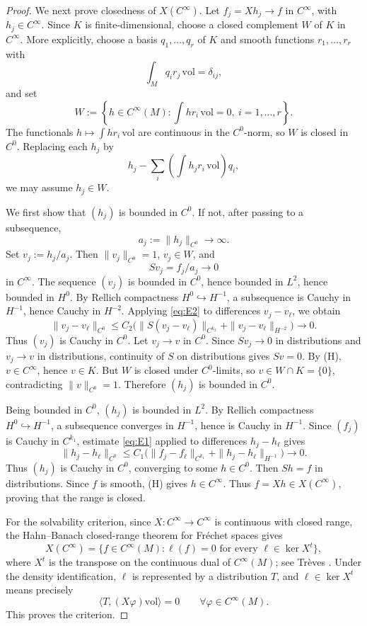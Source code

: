 \documentclass[12pt]{article}
\theoremstyle{definition}
\newcommand{\vol}{\mathrm{vol}}
\begin{document}
\begin{proof}
We next prove closedness of \(X(C^\infty)\).  Let \(f_j=Xh_j\to f\) in \(C^\infty\), with \(h_j\in C^\infty\).  Since \(K\) is finite-dimensional, choose a closed complement \(W\) of \(K\) in \(C^\infty\).  More explicitly, choose a basis \(q_1,\dots,q_r\) of \(K\) and smooth functions \(r_1,\dots,r_r\) with
\[
\int_M q_i r_j\,\vol=\delta_{ij},
\]
and set
\[
W:=\left\{h\in C^\infty(M):\int h r_i\,\vol=0,\ i=1,\dots,r\right\}.
\]
The functionals \(h\mapsto \int h r_i\,\vol\) are continuous in the \(C^0\)-norm, so \(W\) is closed in \(C^0\).  Replacing each \(h_j\) by
\[
h_j-\sum_i\left(\int h_j r_i\,\vol\right)q_i,
\]
we may assume \(h_j\in W\).

We first show that \((h_j)\) is bounded in \(C^0\).  If not, after passing to a subsequence,
\[
a_j:=\|h_j\|_{C^0}\to\infty.
\]
Set \(v_j:=h_j/a_j\).  Then \(\|v_j\|_{C^0}=1\), \(v_j\in W\), and
\[
S v_j=f_j/a_j\to 0
\]
in \(C^\infty\).  The sequence \((v_j)\) is bounded in \(C^0\), hence bounded in \(L^2\), hence bounded in \(H^0\).  By Rellich compactness \(H^0\hookrightarrow H^{-1}\), a subsequence is Cauchy in \(H^{-1}\), hence Cauchy in \(H^{-2}\).  Applying \eqref{eq:E2} to differences \(v_j-v_\ell\), we obtain
\[
\|v_j-v_\ell\|_{C^0}
\le
C_2\bigl(\|S(v_j-v_\ell)\|_{C^{k_2}}+\|v_j-v_\ell\|_{H^{-2}}\bigr)\to 0.
\]
Thus \((v_j)\) is Cauchy in \(C^0\).  Let \(v_j\to v\) in \(C^0\).  Since \(S v_j\to 0\) in distributions and \(v_j\to v\) in distributions, continuity of \(S\) on distributions gives \(S v=0\).  By (H), \(v\in C^\infty\), hence \(v\in K\).  But \(W\) is closed under \(C^0\)-limits, so \(v\in W\cap K=\{0\}\), contradicting \(\|v\|_{C^0}=1\).  Therefore \((h_j)\) is bounded in \(C^0\).

Being bounded in \(C^0\), \((h_j)\) is bounded in \(L^2\).  By Rellich compactness \(H^0\hookrightarrow H^{-1}\), a subsequence converges in \(H^{-1}\), hence is Cauchy in \(H^{-1}\).  Since \((f_j)\) is Cauchy in \(C^{k_1}\), estimate \eqref{eq:E1} applied to differences \(h_j-h_\ell\) gives
\[
\|h_j-h_\ell\|_{C^0}
\le
C_1\bigl(\|f_j-f_\ell\|_{C^{k_1}}+\|h_j-h_\ell\|_{H^{-1}}\bigr)\to 0.
\]
Thus \((h_j)\) is Cauchy in \(C^0\), converging to some \(h\in C^0\).  Then \(S h=f\) in distributions.  Since \(f\) is smooth, (H) gives \(h\in C^\infty\).  Thus \(f=Xh\in X(C^\infty)\), proving that the range is closed.

For the solvability criterion, since \(X:C^\infty\to C^\infty\) is continuous with closed range, the Hahn--Banach closed-range theorem for Fr\'echet spaces gives
\[
X(C^\infty)
=
\{f\in C^\infty(M):\ell(f)=0\text{ for every }\ell\in\ker X^t\},
\]
where \(X^t\) is the transpose on the continuous dual of \(C^\infty(M)\); see Tr\`eves \cite[Theorem 37.2]{Treves}.  Under the density identification, \(\ell\) is represented by a distribution \(T\), and \(\ell\in\ker X^t\) means precisely
\[
\langle T,(X\varphi)\vol\rangle=0
\qquad\forall\varphi\in C^\infty(M).
\]
This proves the criterion.
\end{proof}
\end{document}
